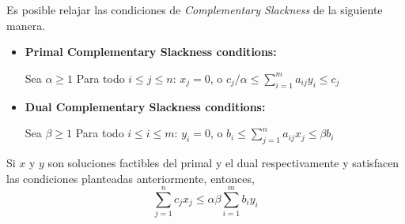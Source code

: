 \documentclass[../np-approximations.tex]{subfiles}
\begin{document}
Es posible relajar las condiciones de \emph{Complementary Slackness} de la siguiente manera.
\begin{itemize}
	\item \textbf{Primal Complementary Slackness conditions:}
	      	      	      	      	      	      	      	      
	      Sea $\alpha \ge 1$
	      Para todo $i\le j\le n$: $x_j=0$, o
	      $c_j/\alpha \le \sum_{i=1}^m a_{ij}y_i \le c_j$
	\item \textbf{Dual Complementary Slackness conditions:}
	      	      	      	      	      	      	      	      
	      Sea $\beta \ge 1$
	      Para todo $i\le i\le m$: $y_i=0$, o
	      $b_i \le \sum_{j=1}^n a_{ij}x_j \le \beta b_i$
\end{itemize}

\begin{theorem}
	\label{theorem:relaxed-cs}
	Si $x$ y $y$ son soluciones factibles del primal y el dual respectivamente y satisfacen las condiciones planteadas anteriormente, entonces,
	\begin{equation*}
		\sum_{j=1}^n c_j x_j \le \alpha \beta \sum_{i=1}^m b_i y_i
	\end{equation*}
\end{theorem}
\end{document}
